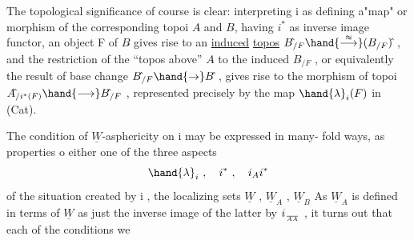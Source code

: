 The topological significance of course is clear: interpreting i as
defining a"map" or morphism of the corresponding topoi $A\hat{}$ and $B\hat{}$, having
$i^*$ as inverse image functor, an object F of $B\hat{}$ gives rise to an \uline{induced}
\uline{topos} $B\hat{}_{/F} \hand{\overset{\approx}{\longrightarrow}} (B_{/F})\hat{}$ , and the restriction of the ``topos above'' $A\hat{}$
to the induced $B\hat{}_{/F}$ , or equivalently the result of base change
$B\hat{}_{/F} \hand{\to} B\hat{}$ , gives rise to the  morphism of topoi $A\hat{}_{/i^*(F)} \hand{\longrightarrow} B\hat{}_{/F}$ ,
represented precisely by the map $\hand{\lambda}_i(F)$ in (Cat).

The condition  of $\underline{W}$-asphericity on i may be expressed in many-%
fold ways, as properties o either one of the three aspects
\[ \hand{\lambda}_i \ , \quad i^* \ , \quad i_Ai^* \]
of the situation created by i ,   the localizing sets $\underline{W}$ , $\underline{W}_A$ , $\underline{W}_B$ \hand{,}  \margin{$\checkmark$}
As $\underline{W}_A$ is defined in terms of $\underline{W}$ as just the inverse image of the latter
by $i_{\over{A}{A}}$ ,  \hand{(}it turns out that each of the conditions we 
